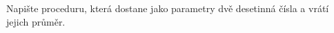 \question[30]
Napište proceduru, která dostane jako parametry dvě desetinná čísla a vrátí
jejich průměr.